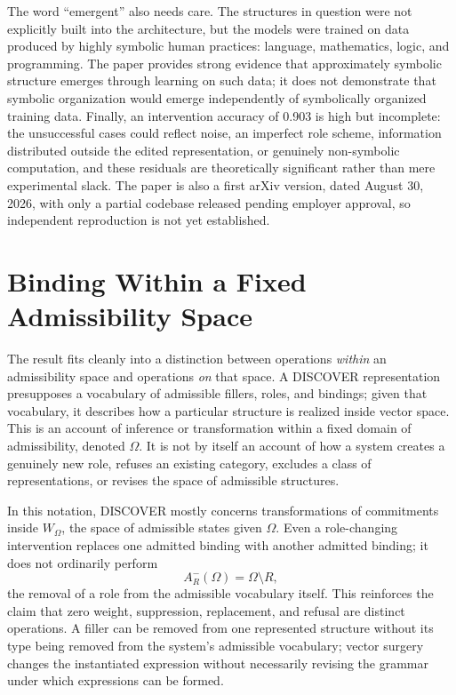 \documentclass[11pt]{article}
\begin{document}
The word ``emergent'' also needs care. The structures in question were not explicitly built into the architecture, but the models were trained on data produced by highly symbolic human practices: language, mathematics, logic, and programming. The paper provides strong evidence that approximately symbolic structure emerges through learning on such data; it does not demonstrate that symbolic organization would emerge independently of symbolically organized training data. Finally, an intervention accuracy of 0.903 is high but incomplete: the unsuccessful cases could reflect noise, an imperfect role scheme, information distributed outside the edited representation, or genuinely non-symbolic computation, and these residuals are theoretically significant rather than mere experimental slack. The paper is also a first arXiv version, dated August 30, 2026, with only a partial codebase released pending employer approval, so independent reproduction is not yet established.

\section{Binding Within a Fixed Admissibility Space}

The result fits cleanly into a distinction between operations \emph{within} an admissibility space and operations \emph{on} that space. A DISCOVER representation presupposes a vocabulary of admissible fillers, roles, and bindings; given that vocabulary, it describes how a particular structure is realized inside vector space. This is an account of inference or transformation within a fixed domain of admissibility, denoted $\Omega$. It is not by itself an account of how a system creates a genuinely new role, refuses an existing category, excludes a class of representations, or revises the space of admissible structures.

In this notation, DISCOVER mostly concerns transformations of commitments inside $W_\Omega$, the space of admissible states given $\Omega$. Even a role-changing intervention replaces one admitted binding with another admitted binding; it does not ordinarily perform
\[
A_R^-(\Omega) = \Omega \setminus R,
\]
the removal of a role from the admissible vocabulary itself. This reinforces the claim that zero weight, suppression, replacement, and refusal are distinct operations. A filler can be removed from one represented structure without its type being removed from the system's admissible vocabulary; vector surgery changes the instantiated expression without necessarily revising the grammar under which expressions can be formed.
\end{document}
